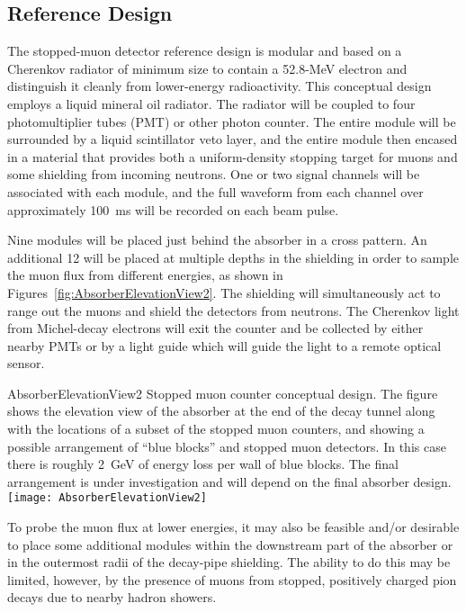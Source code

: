 \subsection{Reference Design}

The stopped-muon detector reference design
is modular and based on a Cherenkov radiator of
minimum size to contain a 52.8-MeV electron and distinguish it cleanly
from lower-energy radioactivity. This conceptual design employs
a liquid mineral oil  radiator. The radiator will be coupled to four photomultiplier tubes (PMT) or
other photon counter.  The entire module will be surrounded by a 
liquid scintillator veto layer, and the entire module then
encased in a material that provides both a uniform-density stopping
target for muons and some shielding from incoming neutrons. One or two
signal channels will be associated with each module, and the full
waveform from each channel over approximately 100~ms will be recorded
on each beam pulse.

Nine modules will be placed just behind the absorber in a cross pattern.  An additional 12 will be 
placed at multiple depths in the shielding in order to sample the muon flux
from different energies, as shown in Figures~\ref{fig:AbsorberElevationView2}. 
The shielding will simultaneously act to range out the muons and shield the detectors from 
neutrons. The Cherenkov light from Michel-decay electrons will exit the 
counter and be collected by either nearby PMTs or by a light guide which will
guide the light to a remote optical sensor.  

\begin{cdrfigure}{AbsorberElevationView2}
{Stopped muon counter conceptual design. The figure shows the elevation view of the 
absorber at the end of the decay tunnel along with the locations of a subset of the
stopped muon counters, and showing a possible arrangement of ``blue blocks'' 
and stopped muon detectors. In this case there is roughly 2~GeV of energy loss 
per wall of blue blocks. The final arrangement is under investigation and will depend on the
final absorber design.}
\texttt{[image: AbsorberElevationView2]}
\end{cdrfigure}

To probe the muon flux at lower energies, it may also
be feasible and/or desirable to place some additional modules within
the downstream part of the absorber or in the outermost radii of the
decay-pipe shielding. The ability to do this may be limited, however,
by the presence of muons from stopped, positively charged pion decays
due to nearby hadron showers.

